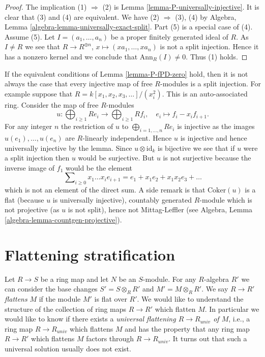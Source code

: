 \begin{proof}
The implication (1) $\Rightarrow$ (2) is
Lemma \ref{lemma-P-universally-injective}.
It is clear that (3) and (4) are equivalent.
We have (2) $\Rightarrow$ (3), (4) by
Algebra, Lemma \ref{algebra-lemma-universally-exact-split}.
Part (5) is a special case of (4).
Assume (5). Let $I = (a_1, \ldots, a_n)$ be a proper finitely generated
ideal of $R$. As $I \not = R$ we see that
$R \to R^{\oplus n}$, $x \mapsto (xa_1, \ldots, xa_n)$
is not a split injection. Hence it has a nonzero kernel and we conclude
that $\text{Ann}_R(I) \not = 0$. Thus (1) holds.
\end{proof}

\begin{example}
\label{example-auto-ass-weird-flat}
If the equivalent conditions of
Lemma \ref{lemma-P-fPD-zero}
hold, then it is not always the case that every injective map of
free $R$-modules is a split injection. For example suppose that
$R = k[x_1, x_2, x_3, \ldots]/(x_i^2)$. This is an auto-associated ring.
Consider the map of free $R$-modules
$$
u :
\bigoplus\nolimits_{i \geq 1} Re_i
\longrightarrow
\bigoplus\nolimits_{i \geq 1} Rf_i,\quad
e_i \longmapsto f_i - x_if_{i + 1}.
$$
For any integer $n$ the restriction of $u$ to
$\bigoplus_{i = 1, \ldots, n} Re_i$ is injective as the images
$u(e_1), \ldots, u(e_n)$ are $R$-linearly independent. Hence
$u$ is injective and hence universally injective by the lemma.
Since $u \otimes \text{id}_k$ is bijective we see that if
$u$ were a split injection then $u$ would be surjective. But $u$ is not
surjective because the inverse image of $f_1$ would be the element
$$
\sum\nolimits_{i \geq 0} x_1 \ldots x_ie_{i + 1} =
e_1 + x_1e_2 + x_1x_2e_3 + \ldots
$$
which is not an element of the direct sum. A side remark is that
$\text{Coker}(u)$ is a flat (because $u$ is universally injective),
countably generated $R$-module which is not projective (as $u$ is not
split), hence not Mittag-Leffler (see
Algebra, Lemma \ref{algebra-lemma-countgen-projective}).
\end{example}






\section{Flattening stratification}
\label{section-flattening}

\noindent
Let $R \to S$ be a ring map and let $N$ be an $S$-module.
For any $R$-algebra $R'$ we can consider the base changes
$S' = S \otimes_R R'$ and $M' = M \otimes_R R'$.
We say $R \to R'$ {\it flattens} $M$ if the module $M'$ is flat over $R'$.
We would like to understand the structure of the collection of ring maps
$R \to R'$ which flatten $M$. In particular we would like to know
if there exists a {\it universal flattening $R \to R_{univ}$ of $M$},
i.e., a ring map $R \to R_{univ}$ which flattens $M$ and has the property
that any ring map $R \to R'$ which flattens $M$ factors through
$R \to R_{univ}$. It turns out that such a universal solution usually
does not exist.

